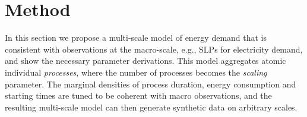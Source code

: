 \documentclass[conference]{IEEEtran}
\begin{document}





\section{Method}
\label{sec:Method}

In this section we propose a multi-scale model of energy demand that is consistent with observations at the macro-scale, e.g., SLPs for electricity demand, and show the necessary parameter derivations. This model aggregates atomic individual \emph{processes}, where the number of processes becomes the \emph{scaling} parameter. The marginal densities of process duration, energy consumption and starting times are tuned to be coherent with macro observations, and the resulting multi-scale model can then generate synthetic data on arbitrary scales.
\end{document}
